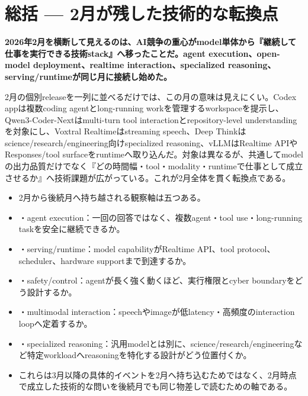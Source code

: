 \section{総括 — 2月が残した技術的な転換点}
\noindent\textbf{2026年2月を横断して見えるのは、AI競争の重心がmodel単体から『継続して仕事を実行できる技術stack』へ移ったことだ。agent execution、open-model deployment、realtime interaction、specialized reasoning、serving/runtimeが同じ月に接続し始めた。}\autocite{src-15823ae5556e,src-5041feb6f87f,src-d8b7c1c36830,src-dd5d9b8662f3,src-eac8dfbeb78c}

2月の個別releaseを一列に並べるだけでは、この月の意味は見えにくい。Codex appは複数coding agentとlong-running workを管理するworkspaceを提示し、Qwen3-Coder-Nextはmulti-turn tool interactionとrepository-level understandingを対象にし、Voxtral Realtimeはstreaming speech、Deep Thinkはscience/research/engineering向けspecialized reasoning、vLLMはRealtime APIやResponses/tool surfaceをruntimeへ取り込んだ。対象は異なるが、共通してmodelの出力品質だけでなく『どの時間幅・tool・modality・runtimeで仕事として成立させるか』へ技術課題が広がっている。これが2月全体を貫く転換点である。\autocite{src-15823ae5556e,src-5041feb6f87f,src-d8b7c1c36830,src-dd5d9b8662f3,src-eac8dfbeb78c}


\begin{itemize}
  \item 2月から後続月へ持ち越される観察軸は五つある。
  \item ・agent execution：一回の回答ではなく、複数agent・tool use・long-running taskを安全に継続できるか。
  \item ・serving/runtime：model capabilityがRealtime API、tool protocol、scheduler、hardware supportまで到達するか。
  \item ・safety/control：agentが長く強く動くほど、実行権限とcyber boundaryをどう設計するか。
  \item ・multimodal interaction：speechやimageが低latency・高頻度のinteraction loopへ定着するか。
  \item ・specialized reasoning：汎用modelとは別に、science/research/engineeringなど特定workloadへreasoningを特化する設計がどう位置付くか。
  \item これらは3月以降の具体的イベントを2月へ持ち込むためではなく、2月時点で成立した技術的な問いを後続月でも同じ物差しで読むための軸である。
\end{itemize}
\autocite{src-15823ae5556e,src-4a841ea7ec7c,src-5041feb6f87f,src-9aba7995b6a5,src-d8b7c1c36830,src-dd5d9b8662f3,src-dd64fe3084a4}

